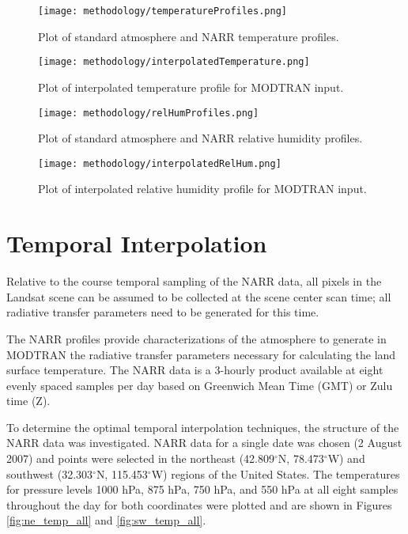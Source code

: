 \documentclass{book}
\begin{document}
\begin{figure}[H]
\begin{minipage}[b]{0.47\textwidth}
\centering
\texttt{[image: methodology/temperatureProfiles.png]}
\caption{Plot of standard atmosphere and NARR temperature profiles.}
\label{fig:temperatureProfiles}
\end{minipage}
\begin{minipage}[b]{0.47\textwidth}
\centering
\texttt{[image: methodology/interpolatedTemperature.png]}
\caption{Plot of interpolated temperature profile for MODTRAN input.}
\label{fig:interpolatedTemperature}
\end{minipage}
\end{figure}

\begin{figure}[H]
\begin{minipage}[b]{0.47\textwidth}
\centering
\texttt{[image: methodology/relHumProfiles.png]}
\caption{Plot of standard atmosphere and NARR relative humidity profiles.}
\label{fig:relHumProfiles}
\end{minipage}
\begin{minipage}[b]{0.47\textwidth}
\centering
\texttt{[image: methodology/interpolatedRelHum.png]}
\caption{Plot of interpolated relative humidity profile for MODTRAN input.}
\label{fig:interpolatedRelHum}
\end{minipage}
\end{figure}

\section{Temporal Interpolation}
\label{sec:temporalinterpolation}

Relative to the course temporal sampling of the NARR data, all pixels in the Landsat scene can be assumed to be collected at the scene center scan time; all radiative transfer parameters need to be generated for this time.

The NARR profiles provide characterizations of the atmosphere to generate in MODTRAN the radiative transfer parameters necessary for calculating the land surface temperature.  The NARR data is a 3-hourly product available at eight evenly spaced samples per day based on Greenwich Mean Time (GMT) or Zulu time (Z).

To determine the optimal temporal interpolation techniques, the structure of the NARR data was investigated.  NARR data for a single date was chosen (2 August 2007) and points were selected in the northeast (42.809$^\circ$N, 78.473$^\circ$W) and southwest (32.303$^\circ$N, 115.453$^\circ$W) regions of the United States.  The temperatures for pressure levels 1000 hPa, 875 hPa, 750 hPa, and 550 hPa at all eight samples throughout the day for both coordinates were plotted and are shown in Figures \ref{fig:ne_temp_all} and \ref{fig:sw_temp_all}.
\end{document}

